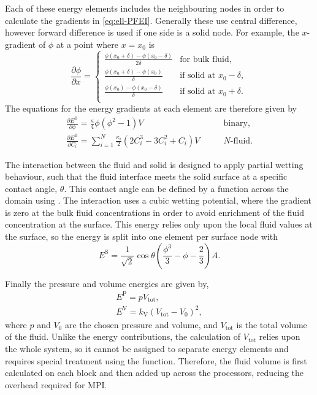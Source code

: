 Each of these energy elements includes the neighbouring nodes in order to calculate the gradients in \cref{eq:ell-PFEI}.
Generally these use central difference, however forward difference is used if one side is a solid node.
For example, the $x$-gradient of $\phi$ at a point where $x=x_0$ is
\begin{equation}
  \frac{\partial \phi}{\partial x} =
  \begin{cases}
    \frac{\phi(x_0+\delta) - \phi(x_0-\delta)} {2\delta} & \text{for bulk fluid},\\
    \frac{\phi(x_0+\delta) - \phi(x_0)} {\delta}         & \text{if solid at $x_0-\delta$},\\
    \frac{\phi(x_0) - \phi(x_0-\delta)} {\delta}         & \text{if solid at $x_0+\delta$}.\\
  \end{cases}
\end{equation}
The equations for the energy gradients at each element are therefore given by
\begin{align}
  \frac{\partial E^\text{B}}{\partial \phi} = \frac{\kappa}{4} \phi (\phi^2 - 1) V \qquad& \text{binary},\\
  \frac{\partial E^\text{B}}{\partial C_i} = \sum_{i=1}^{N} \frac{\kappa_i}{2} (2C_i^3 - 3C_i^2 + C_i) V \qquad& \text{$N$-fluid}.
\end{align}

The interaction between the fluid and solid is designed to apply partial wetting behaviour, such that the fluid interface meets the solid surface at a specific contact angle, $\theta$.
This contact angle can be defined by a function across the domain using .
The interaction uses a cubic wetting potential, where the gradient is zero at the bulk fluid concentrations in order to avoid enrichment of the fluid concentration at the surface.
This energy relies only upon the local fluid values at the surface, so the energy is split into one element per surface node with
\begin{equation}
  E^\text{S} = \frac{1}{\sqrt{2}} \cos{\theta} \left( \frac{\phi^3}{3} - \phi - \frac{2}{3} \right) A.
\end{equation}

Finally the pressure and volume energies are given by,
\begin{gather}
  E^\text{P} = p V_\text{tot},\\
  E^\text{V} = k_\text{V} (V_\text{tot} - V_0)^2,
\end{gather}
where $p$ and $V_0$ are the chosen pressure and volume, and $V_\text{tot}$ is the total volume of the fluid.
Unlike the energy contributions, the calculation of $V_\text{tot}$ relies upon the whole system, so it cannot be assigned to separate energy elements and requires special treatment using the  function.
Therefore, the fluid volume is first calculated on each block and then added up across the processors, reducing the overhead required for MPI.



